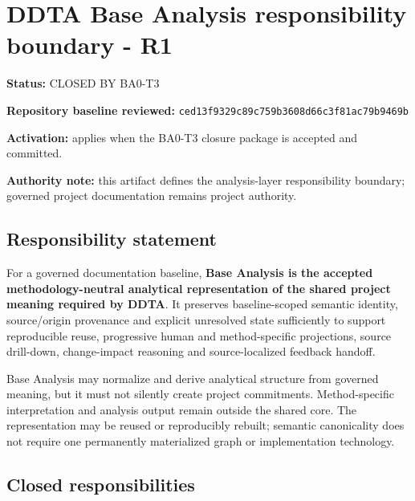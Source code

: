 \documentclass[
  10pt,
]{article}
\author{}
\date{}
\begin{document}
\section{DDTA Base Analysis responsibility boundary -
R1}\label{ddta-base-analysis-responsibility-boundary---r1}

\textbf{Status:} CLOSED BY BA0-T3

\textbf{Repository baseline reviewed:}
\texttt{ced13f9329c89c759b3608d66c3f81ac79b9469b}

\textbf{Activation:} applies when the BA0-T3 closure package is accepted
and committed.

\textbf{Authority note:} this artifact defines the analysis-layer
responsibility boundary; governed project documentation remains project
authority.

\subsection{Responsibility statement}\label{responsibility-statement}

For a governed documentation baseline, \textbf{Base Analysis is the
accepted methodology-neutral analytical representation of the shared
project meaning required by DDTA}. It preserves baseline-scoped semantic
identity, source/origin provenance and explicit unresolved state
sufficiently to support reproducible reuse, progressive human and
method-specific projections, source drill-down, change-impact reasoning
and source-localized feedback handoff.

Base Analysis may normalize and derive analytical structure from
governed meaning, but it must not silently create project commitments.
Method-specific interpretation and analysis output remain outside the
shared core. The representation may be reused or reproducibly rebuilt;
semantic canonicality does not require one permanently materialized
graph or implementation technology.

\subsection{Closed responsibilities}\label{closed-responsibilities}
\end{document}

